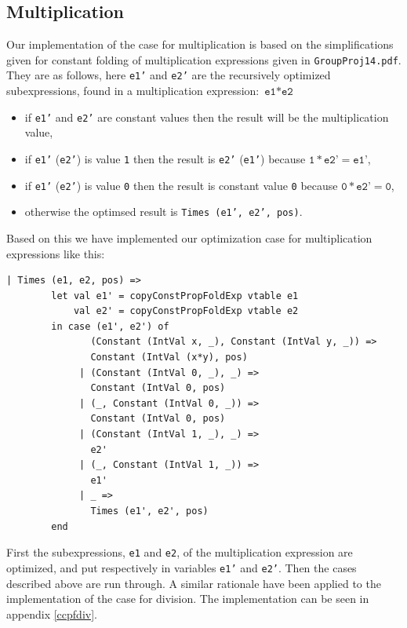 \documentclass[11pt]{article}
\begin{document}
	\subsection{Multiplication}
	Our implementation of the case for multiplication is based on the simplifications
	given for constant folding of multiplication expressions given in \texttt{GroupProj14.pdf}.
	They are as follows, here \texttt{e1'} and \texttt{e2'} are the recursively optimized
	subexpressions, found in a multiplication expression: $ \texttt{e1} \ast \texttt{e2}$
	\begin{itemize}
	\item if \texttt{e1'} and \texttt{e2'} are constant values then the result will be the
			multiplication value,
	\item if \texttt{e1'} (\texttt{e2'}) is value \texttt{1} then the result is \texttt{e2'}
			(\texttt{e1'}) because $\texttt{1} \ast \texttt{e2'} = \texttt{e1'}$,
	\item if \texttt{e1'} (\texttt{e2'}) is value \texttt{0} then the result is constant value
			\texttt{0} because $\texttt{0} \ast \texttt{e2'} = \texttt{0}$,
	\item otherwise the optimsed result is  \texttt{Times (e1', e2', pos)}.
	\end{itemize}
	Based on this we have implemented our optimization case for multiplication expressions like this:
	\begin{lstlisting}[basicstyle=\small]
      | Times (e1, e2, pos) =>
        let val e1' = copyConstPropFoldExp vtable e1
            val e2' = copyConstPropFoldExp vtable e2
        in case (e1', e2') of
               (Constant (IntVal x, _), Constant (IntVal y, _)) =>
               Constant (IntVal (x*y), pos)
             | (Constant (IntVal 0, _), _) =>
               Constant (IntVal 0, pos)
             | (_, Constant (IntVal 0, _)) =>
               Constant (IntVal 0, pos)
             | (Constant (IntVal 1, _), _) =>
               e2'
             | (_, Constant (IntVal 1, _)) =>
               e1'
             | _ =>
               Times (e1', e2', pos)
        end
	\end{lstlisting}
	First the subexpressions, \texttt{e1} and \texttt{e2}, of the multiplication expression are
	optimized, and put respectively in variables \texttt{e1'} and \texttt{e2'}.
	Then the cases described above are run through. A similar rationale have been applied to the
	implementation of the case for division. The implementation can be seen in appendix \ref{ccpfdiv}.
\end{document}
